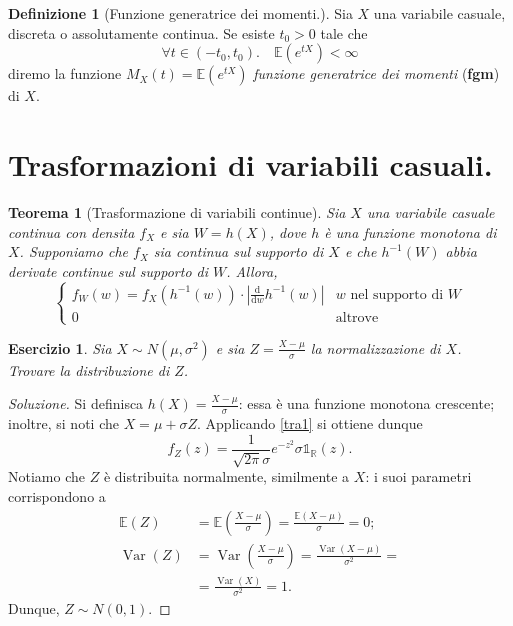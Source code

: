 \documentclass[fontsize=11pt,paper=A4,oneside,index=totoc,hyperref]{book}
\theoremstyle{definition}
\newtheorem{dfn}{Definizione}[]
\theoremstyle{plain}
\newtheorem{thm}{Teorema}[section]
\newtheorem{exe}{Esercizio}[section]
\newcommand{\Asp}{\mathbb{E}}
\newcommand{\Ind}[1]{\mathbb{1}_{#1}}
\DeclareMathOperator{\Var}{Var}
\begin{document}
\begin{dfn}[Funzione generatrice dei momenti.]
  Sia \(X\) una variabile casuale, discreta o assolutamente continua. Se esiste \(t_0 > 0\) tale che
  \begin{equation}
    \forall t \in (-t_0,t_0).\quad \Asp(e^{tX}) < \infty
  \end{equation}
  diremo la funzione \(M_X(t) = \Asp(e^{tX})\) \emph{funzione generatrice dei momenti} ({\bf fgm}) di \(X\).
\end{dfn}


\section{Trasformazioni di variabili casuali.}

\begin{thm}[Trasformazione di variabili continue]
  Sia \(X\) una variabile casuale continua con densita \(f_X\) e sia \(W = h(X)\), dove \(h\) è una funzione monotona di \(X\). Supponiamo che \(f_X\) sia continua sul supporto di \(X\) e che \(h^{-1}(W)\) abbia derivate continue sul supporto di \(W\). Allora,
  \begin{equation}
    \begin{cases}
      f_W(w) = f_X(h^{-1}(w))\cdot\left\lvert \frac{\mathrm{d}}{\mathrm{d}w}h^{-1}(w)\right\rvert & w \text{ nel supporto di } W \\ 0 & \text{altrove}
    \end{cases} \label{tra1}
  \end{equation}
\end{thm}
\begin{exe}
  Sia \(X \sim N(\mu,\sigma^2)\) e sia \(Z = \tfrac{X - \mu}{\sigma}\) la \emph{normalizzazione} di \(X\). Trovare la distribuzione di \(Z\).
\end{exe}
\begin{proof}[Soluzione]
  Si definisca \(h(X) = \tfrac{X - \mu}{\sigma}\): essa è una funzione monotona crescente; inoltre, si noti che \(X = \mu + \sigma Z\). Applicando \eqref{tra1} si ottiene dunque
  \[
  f_Z(z) = \frac{1}{\sqrt{2\pi}\sigma}e^{-z^2}\sigma\Ind{\mathbb{R}}(z).
  \]
  Notiamo che \(Z\) è distribuita normalmente, similmente a \(X\): i suoi parametri corrispondono a
  \begin{align*}
    \Asp(Z) &= \Asp\left(\frac{X-\mu}{\sigma}\right) = \frac{\Asp(X-\mu)}{\sigma} = 0; \\
    \Var(Z) &= \Var\left(\frac{X-\mu}{\sigma}\right) = \frac{\Var(X-\mu)}{\sigma^2} = \\ &= \frac{\Var(X)}{\sigma^2} = 1.
  \end{align*}
  Dunque, \(Z \sim N(0,1)\).
\end{proof}
\end{document}
